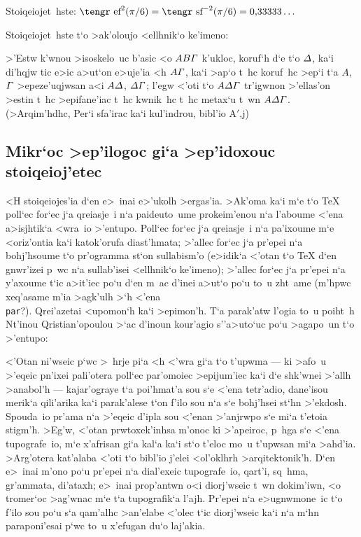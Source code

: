 \exercise Stoiqeiojet~hste:
\def\efptm{\mathop{\hbox{\tengr ef}}\nolimits}
\def\sfptm{\mathop{\hbox{\tengr sf}}\nolimits}
$\efptm^2 (\pi / 6) = \sfptm^{-2} (\pi / 6) = 0{,}33333\ldots $

\exercise Stoiqeiojet~hste t`o >ak'oloujo <ellhnik`o ke'imeno:

{\narrower\noindent
>'Estw k'wnou >isoskelo~uc b'asic <o $AB{\mit \Gamma}$ k'ukloc, koruf`h
d`e t`o $\mit \Delta$, ka`i di'hqjw tic e>ic a>ut`on e>uje'ia <h $A\mit
\Gamma$, ka`i >ap`o t~hc koruf~hc >ep`i t`a $A$, $\mit \Gamma$
>epeze'uqjwsan a<i $A\mit \Delta$, $\mit \Delta\Gamma$; l'egw <'oti t`o
$A\mit \Delta\Gamma$ tr'igwnon >'ellas'on >estin t~hc >epifane'iac t~hc
kwnik~hc t~hc metax`u t~wn $A\mit \Delta\Gamma$. (>Arqim'hdhc, {\tengs
Per`i sfa'irac ka`i kul'indrou}, bibl'io A$'$,\NB{}j)

} %

\subsection{Mikr`oc >ep'ilogoc gi`a >ep'idoxouc stoiqeioj'etec}

<H stoiqeiojes'ia d`en e>~inai e>'ukolh >ergas'ia.  >Ak'oma ka`i m`e t`o
{\rm \TeX} poll`ec for`ec j`a qrei\-a\-sje~i n`a paideuto~ume
prokeim'enou n`a l'aboume <'ena a>isjhtik`a <wra~io >'entupo.  Poll`ec
for`ec j`a qreiasje~i n`a pa'ixoume m`e <oriz'ontia ka`i katok'orufa
diast'hmata; >'allec for`ec j`a pr'epei n`a bo\-h\-j'h\-soume t`o
pr'ogramma st`on sullabism'o (e>idik`a <'otan t`o {\rm \TeX} d`en
gnwr'izei p~wc n`a sullab'isei <ellhnik`o ke'imeno); >'allec for`ec j`a
pr'epei n`a y'axoume t`ic a>it'iec po`u d`en m~ac d'inei a>ut`o po`u
to~u zht~ame (m'hpwc xeq'asame m'ia >agk'ulh >`h <'ena {\tt
\\par}?)\null.  Qrei'azetai <upomon`h ka`i >epimon'h.  T`a parak'atw
l'ogia to~u poiht~h Nt'inou Qristian'opoulou >`ac d'inoun kour'agio
s''\NB{}a>uto`uc po`u >agapo~un t`o >'entupo:
 
{\narrower
<'Otan ni'wseic p`wc >~hrje pi`a <h <'wra gi`a t`o t'upwma --- ki >afo~u
>'eqeic pn'ixei pali'otera poll`ec par'omoiec >epijum'iec ka`i d`e
shk'wnei >'allh >anabol'h --- kajar'ograye t`a poi'hmat'a sou s`e <'ena
tetr'adio, dane'isou merik`a qili'arika ka`i parak'alese t`on f'ilo sou
n`a s`e bohj'hsei st`hn >'ekdosh.  Spouda~io pr'ama n`a >'eqeic d'ipla
sou <'enan >'anjrwpo s`e mi`a t'etoia stigm'h.  >Eg'w, <'otan
prwtoxek'inhsa m'onoc ki >'apeiroc, p~hga s`e <'ena tupografe~io, m`e
x'afrisan gi`a kal`a ka`i st`o t'eloc mo~u t'upwsan mi`a >ahd'ia. 
>Arg'otera kat'alaba <'oti t`o bibl'io j'elei <ol'oklhrh
>arqitektonik'h.  D`en e>~inai m'ono po`u pr'epei n`a dial'exeic
tupografe~io, qart'i, sq~hma, gr'ammata, di'ataxh; e>~inai prop'antwn
o<i diorj'wseic t~wn dokim'iwn, <o tromer`oc >ag'wnac m`e t`a
tupografik`a l'ajh.  Pr'epei n`a e>ugnwmone~ic t`o f'ilo sou po`u s`a
qam'alhc >an'elabe <'olec t`ic diorj'wseic ka`i n`a m`hn paraponi'esai
p`wc to~u x'efugan du`o laj'akia.

} %

